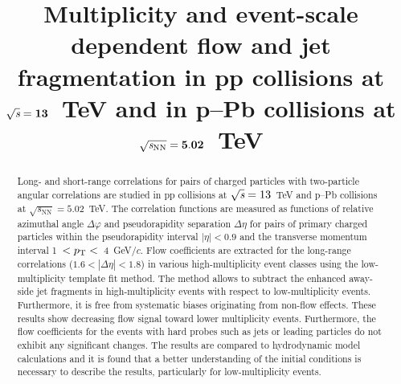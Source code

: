 \documentclass[ALICE,manyauthors]{cernphprep}
\begin{document}
\begin{titlepage}

\PHyear{}
\PHdate{\today}
%

\title{Multiplicity and event-scale dependent flow and jet fragmentation in pp collisions at ${\sqrt{{\textit s}}}=\mathbf{13}$~TeV and in p--Pb collisions at ${\sqrt{{\textit s_\mathrm{NN}}}} = \mathbf{5.02}$~TeV}


\begin{abstract}
%
Long- and short-range correlations for pairs of charged particles with two-particle angular correlations are studied in pp collisions at ${\sqrt{{\textit s}}}=13$~TeV and p--Pb collisions at ${\sqrt{s_\mathrm{NN}}} = 5.02$~TeV. The correlation functions are measured as functions of relative azimuthal angle $\Delta\varphi$ and pseudorapidity separation $\Delta\eta$ for pairs of primary charged particles within the pseudorapidity interval $|\eta| < 0.9$ and the transverse momentum interval 1~$ < p_\mathrm{T} < $~4~GeV/$c$.
Flow coefficients are extracted for the long-range correlations ($1.6 < |\Delta\eta| <1.8$) in various high-multiplicity event classes using the low-multiplicity template fit method. The method allows to subtract the enhanced away-side jet fragments in high-multiplicity events with respect to low-multiplicity events. Furthermore, it is free from systematic biases originating from non-flow effects. These results show decreasing flow signal toward lower multiplicity events. Furthermore, the flow coefficients for the events with hard probes such as jets or leading particles do not exhibit any significant changes. The results are compared to hydrodynamic model calculations and it is found that a better understanding of the initial conditions is necessary to describe the results, particularly for low-multiplicity events.





\end{abstract}

\end{titlepage}
\end{document}
